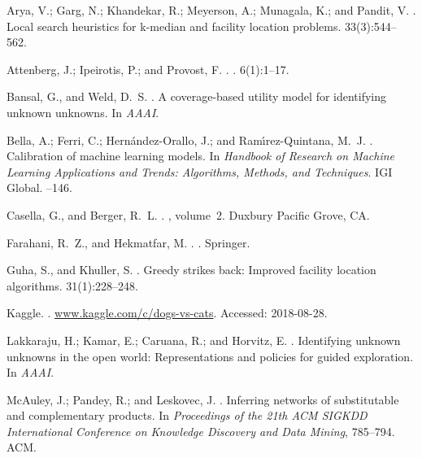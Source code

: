 \documentclass[10pt, conference]{IEEEtran}
\begin{document}
\begin{thebibliography}{1}

Arya, V.; Garg, N.; Khandekar, R.; Meyerson, A.; Munagala, K.; and Pandit, V.
.
\newblock Local search heuristics for k-median and facility location problems.
 33(3):544--562.

Attenberg, J.; Ipeirotis, P.; and Provost, F.
.
.
 6(1):1--17.

Bansal, G., and Weld, D.~S.
.
\newblock A coverage-based utility model for identifying unknown unknowns.
\newblock In {\em AAAI}.

Bella, A.; Ferri, C.; Hern{\'a}ndez-Orallo, J.; and Ram{\'\i}rez-Quintana,
  M.~J.
.
\newblock Calibration of machine learning models.
\newblock In {\em Handbook of Research on Machine Learning Applications and
  Trends: Algorithms, Methods, and Techniques}. IGI Global.
--146.

Casella, G., and Berger, R.~L.
.
, volume~2.
\newblock Duxbury Pacific Grove, CA.

Farahani, R.~Z., and Hekmatfar, M.
.
.
\newblock Springer.

Guha, S., and Khuller, S.
.
\newblock Greedy strikes back: Improved facility location algorithms.
 31(1):228--248.

Kaggle.
.
\newblock \url{www.kaggle.com/c/dogs-vs-cats}.
\newblock Accessed: 2018-08-28.

Lakkaraju, H.; Kamar, E.; Caruana, R.; and Horvitz, E.
.
\newblock Identifying unknown unknowns in the open world: Representations and
  policies for guided exploration.
\newblock In {\em AAAI}.

McAuley, J.; Pandey, R.; and Leskovec, J.
.
\newblock Inferring networks of substitutable and complementary products.
\newblock In {\em Proceedings of the 21th ACM SIGKDD International Conference
  on Knowledge Discovery and Data Mining},  785--794.
\newblock ACM.


\end{thebibliography}
\end{document}
